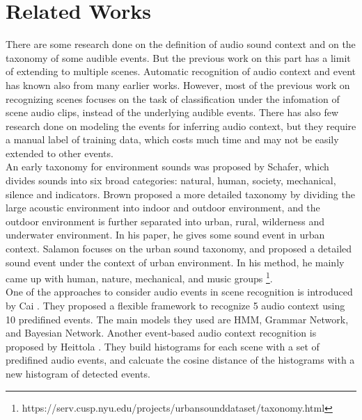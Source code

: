 \chapter{Related Works}
There are some research done on the definition of audio sound context and on the taxonomy of some audible events. 
But the previous work on this part has a limit of extending to multiple scenes. 
Automatic recognition of audio context and event has known also from many earlier works. 
However, most of the previous work on recognizing scenes focuses on the task of classification under the infomation of scene audio clips, instead of the underlying audible events. 
There has also few research done on modeling the events for inferring audio context, but they require a manual label of training data, which costs much time and may not be easily extended to other events. \\ 

An early taxonomy for environment sounds was proposed by Schafer\parencite{schafer1993soundscape}, which divides sounds into six broad categories: natural, human, society, mechanical, silence and indicators. 
Brown\parencite{brown2011towards} proposed a more detailed taxonomy by dividing the large acoustic environment into indoor and outdoor environment, and the outdoor environment is further separated into urban, rural, wilderness and underwater environment. 
In his paper, he gives some sound event in urban context.
Salamon\parencite{salamon urban} focuses on the urban sound taxonomy, and proposed a detailed sound event under the context of urban environment. 
In his method, he mainly came up with human, nature, mechanical, and music groups \footnote{https://serv.cusp.nyu.edu/projects/urbansounddataset/taxonomy.html}. \\ 

One of the approaches to consider audio events in scene recognition is introduced by Cai \et \parencite{}. 
They proposed a flexible framework to recognize 5 audio context using 10 predifined events. 
The main models they used are HMM, Grammar Network, and Bayesian Network. 
Another event-based audio context recognition is proposed by Heittola \et \parencite{}. 
They build histograms for each scene with a set of predifined audio events, and calcuate the cosine distance of the histograms with a new histogram of detected events.\\


